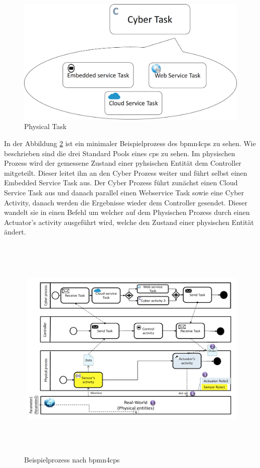 \documentclass[a4paper, 12pt, twoside, headsepline=true]{scrartcl} %
\begin{document}
\begin{figure}[H]
	\includegraphics[height=4 cm,keepaspectratio,center]{figures/CyberTask}
	\caption{Physical Task\cite{BMPN4CPS}}
	\label{fig:cybertask}
\end{figure} 

In der Abbildung \ref{fig:bpmn4cpsProcess} ist ein minimaler Beispielprozess des \ac{bpmn4cps} zu sehen. Wie beschrieben sind die drei Standard Pools eines \ac{cps} zu sehen. Im physischen Prozess wird der gemessene Zustand einer pyhsischen Entität dem Controller mitgeteilt. Dieser leitet ihn an den Cyber Prozess weiter und führt selbst einen Embedded Service Task aus. Der Cyber Prozess führt zunächst einen Cloud Service Task aus und danach parallel einen Webservice Task sowie eine Cyber Activity, danach werden die Ergebnisse wieder dem Controller gesendet. Dieser wandelt sie in einen Befehl um welcher auf dem Physischen Prozess durch einen Actuator's activity ausgeführt wird, welche den Zustand einer physischen Entität ändert. 

\begin{figure}[H]
	\includegraphics[height=11cm,keepaspectratio,center]{figures/bpmn4cpsProcess}
	\caption{Beispielprozess nach \ac{bpmn4cps} \cite{BMPN4CPS}}
	\label{fig:bpmn4cpsProcess}
\end{figure} 
\end{document}
